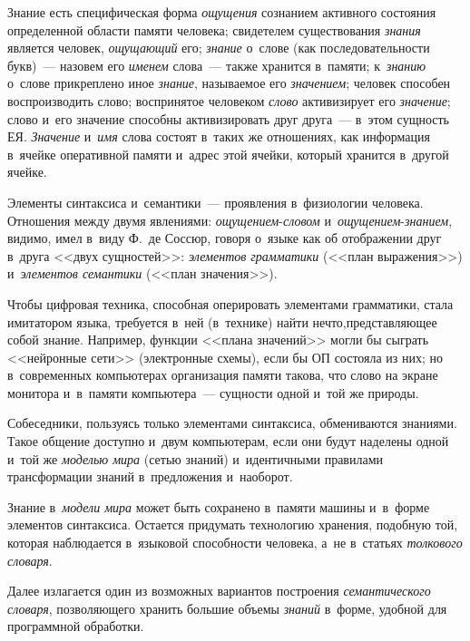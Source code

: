 \begin{multicols}{2}
     Знание есть специфическая форма \textit{ощущения} сознанием 
активного состояния определенной об\-ласти памяти человека; свидетелем 
существования \textit{знания} является человек, \textit{ощущающий} его; 
\textit{знание} о~слове (как последовательности букв)~--- назовем его 
\textit{именем} слова~--- также хранится в~памяти; к~\textit{знанию} о~слове 
прикреплено иное \textit{знание}, называемое его \textit{значением}; человек 
способен воспроизводить слово; воспринятое человеком \textit{слово} 
активизирует его \textit{значение}; слово и~его значение способны 
активизировать друг друга~--- в~этом сущность ЕЯ. \textit{Значение} 
и~\textit{имя} слова состоят в~таких же отношениях, как информация 
в~ячейке оперативной памяти и~адрес этой ячейки, который хранится 
в~другой ячейке. 
     
     Элементы синтаксиса и~семантики~--- проявления в~физиологии 
человека. Отношения между двумя явлениями: 
\textit{ощущением}-\textit{словом} и~\textit{ощу\-ще\-ни\-ем}-\textit{зна\-ни\-ем}, видимо, имел в~виду 
Ф.~де Соссюр, говоря о~языке как об отображении друг в~друга <<двух 
сущностей>>: \textit{элементов грамматики} (<<план выражения>>) 
и~\textit{элементов семантики} (<<план значения>>).
     
     Чтобы цифровая техника, способная оперировать элементами 
грамматики, стала имитатором языка, требуется в~ней (в~технике) найти 
нечто,\linebreak представляющее собой знание. Например, функции <<плана 
значений>> могли бы сыграть <<нейронные сети>> (электронные схемы), 
если бы ОП состояла из них; но в~современных компьютерах \mbox{организация} 
памяти такова, что слово на экране монитора и~в~памяти компьютера~--- 
сущности одной и~той же природы.
     
     Собеседники, пользуясь только элементами синтаксиса, обмениваются 
знаниями. Такое общение доступно и~двум компьютерам, если они будут 
наделены одной и~той же \textit{моделью мира} (сетью знаний) 
и~идентичными правилами трансформации знаний в~предложения 
и~наоборот.
     
     Знание в~\textit{модели мира} может быть сохранено в~памяти машины 
и~в~форме элементов синтаксиса. Остается придумать технологию хранения, 
подобную той, которая наблюдается в~языковой способности человека, а~не 
в~статьях \textit{толкового словаря}.
     
     Далее излагается один из возможных вариантов построения 
\textit{семантического словаря}, позволяющего хранить большие объемы 
\textit{знаний} в~форме, удобной для программной обработки. 
     

\end{multicols}
